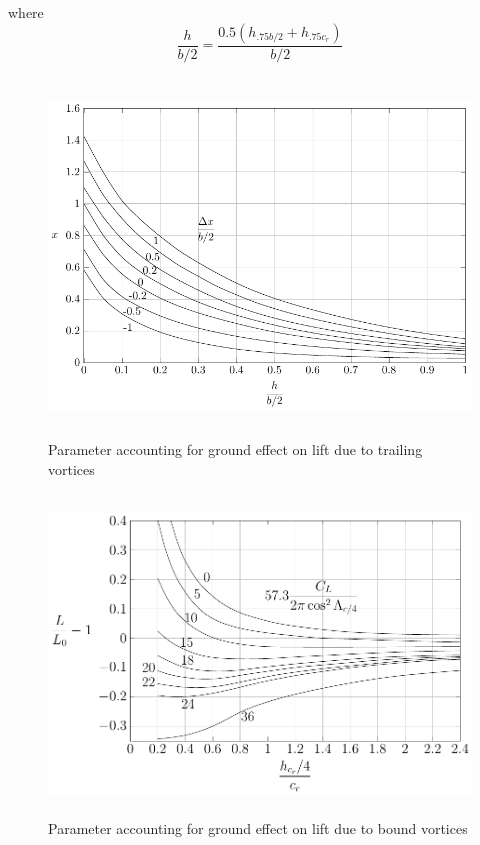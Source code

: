 where
\[\frac{h}{b/2}=\frac{0.5\left(h_{.75b/2}+h_{.75c_r}\right)}{b/2}\]

\begin{figure}[H]
	\centering
	\includegraphics[height=9.5cm, keepaspectratio ]{Immagini/Capitolo2/2_6-(Delta_alpha_CL_Ground_Effect)_x_vs_2hfracb_Deltax} 
	\caption{Parameter accounting for ground effect on lift due to trailing vortices} %
	\label{fig:figura2_6} %
\end{figure}


\begin{figure}[H]
	\includegraphics[height=8.5cm, keepaspectratio ]{Immagini/Capitolo2/2_8-Delta_alpha_CL_Ground_Effect_L_L0_minus1_vs_h_cr_4_cr} 
	\caption{Parameter accounting for ground effect on lift due to bound vortices} %
	\label{fig:figura2_8} %
\end{figure}

